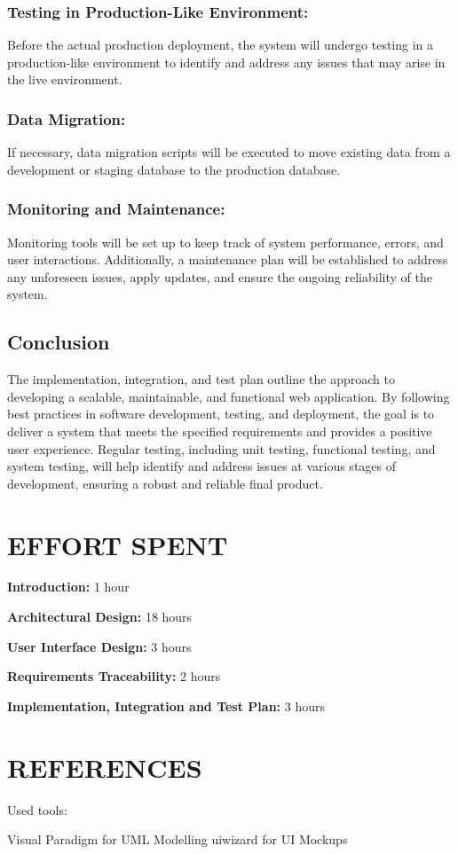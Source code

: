 \documentclass{article}
\begin{document}
\subsubsection*{Testing in Production-Like Environment:}
Before the actual production deployment, the system will undergo testing in a production-like environment to identify and address any issues that may arise in the live environment.

\subsubsection*{Data Migration:}
If necessary, data migration scripts will be executed to move existing data from a development or staging database to the production database.

\subsubsection*{Monitoring and Maintenance:}
Monitoring tools will be set up to keep track of system performance, errors, and user interactions. Additionally, a maintenance plan will be established to address any unforeseen issues, apply updates, and ensure the ongoing reliability of the system.

\subsection{Conclusion}

The implementation, integration, and test plan outline the approach to developing a scalable, maintainable, and functional web application. By following best practices in software development, testing, and deployment, the goal is to deliver a system that meets the specified requirements and provides a positive user experience. Regular testing, including unit testing, functional testing, and system testing, will help identify and address issues at various stages of development, ensuring a robust and reliable final product.

\section{EFFORT SPENT}

\textbf{Introduction:} 1 hour 

\textbf{Architectural Design:} 18 hours

\textbf{User Interface Design:} 3 hours

\textbf{Requirements Traceability:} 2 hours

\textbf{Implementation, Integration and Test Plan:} 3 hours

\section{REFERENCES}

Used tools:

Visual Paradigm for UML Modelling 
uiwizard for UI Mockups
\end{document}
